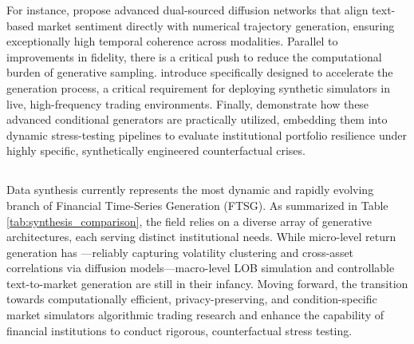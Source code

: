 For instance, \citep{lozano2023dual} propose advanced dual-sourced diffusion networks that align text-based market sentiment directly with numerical trajectory generation, ensuring exceptionally high temporal coherence across modalities. Parallel to improvements in fidelity, there is a critical push to reduce the computational burden of generative sampling. \citep{tao2024} introduce specifically designed to accelerate the generation process, a critical requirement for deploying synthetic simulators in live, high-frequency trading environments. Finally, \citep{oppel2025} demonstrate how these advanced conditional generators are practically utilized, embedding them into dynamic stress-testing pipelines to evaluate institutional portfolio resilience under highly specific, synthetically engineered counterfactual crises.

\subsection{}

Data synthesis currently represents the most dynamic and rapidly evolving branch of Financial Time-Series Generation (FTSG). As summarized in Table \ref{tab:synthesis_comparison}, the field relies on a diverse array of generative architectures, each serving distinct institutional needs. While micro-level return generation has —reliably capturing volatility clustering and cross-asset correlations via diffusion models—macro-level LOB simulation and controllable text-to-market generation are still in their infancy. Moving forward, the transition towards computationally efficient, privacy-preserving, and condition-specific market simulators algorithmic trading research and enhance the capability of financial institutions to conduct rigorous, counterfactual stress testing.
